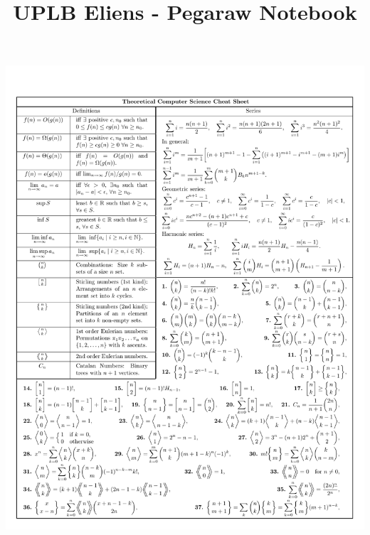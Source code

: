 \documentclass[10pt]{article}
\title{\vspace{-4ex}\Large{UPLB Eliens - Pegaraw Notebook}}
\author{}
\date{}
\begin{document}
\begin{landscape}
\begin{multicols}{3}

\maketitle
\vspace{-13ex}
\tableofcontents
\pagestyle{fancy}



\end{multicols}
\end{landscape}

\centerline{\includegraphics[trim={0 0 0 3cm}, clip, width=\textwidth]{cheatsheet/p01.pdf}}
\end{document}
